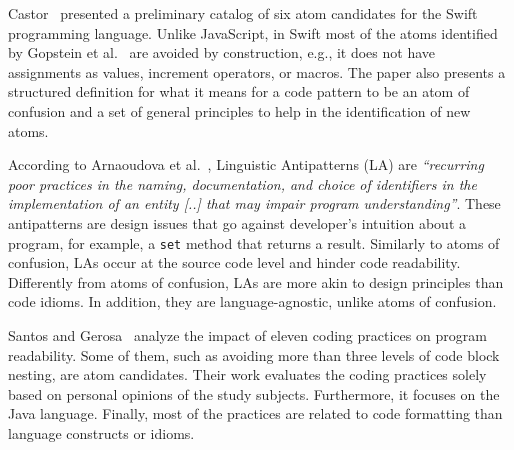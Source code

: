 Castor~\cite{castor2018} presented a preliminary catalog of six atom candidates for the Swift programming language. Unlike JavaScript, in Swift most of the atoms identified by Gopstein et al.~\cite{DBLP:conf/sigsoft/GopsteinIYDZYC17} are avoided by construction, e.g., it does not have assignments as values, increment operators, or macros. The paper also presents a structured definition for what it means for a code pattern to be an atom of confusion and a set of general principles to help in the identification of new atoms. 


According to Arnaoudova et al.~\cite{Arnaoudova:2016:LAW}, Linguistic Antipatterns (LA) are \textit{``recurring poor practices in the naming, documentation, and choice of identifiers in the implementation of an entity [..] that may impair program understanding''}. These antipatterns are design issues that go against developer's  intuition about a program, for example, a \texttt{set} method that returns a result. Similarly to atoms of confusion, LAs occur at the source code level and hinder code readability. Differently from atoms of confusion, LAs are more akin to design principles than code idioms. In addition, they are language-agnostic, unlike atoms of confusion.

Santos and Gerosa~\cite{Santos:2018:ICP} analyze the impact of eleven coding practices on program readability. Some of them, such as avoiding more than three levels of code
block nesting, are atom candidates. 
Their work evaluates the coding practices solely based on personal opinions of the study subjects. Furthermore, it focuses on the Java language. Finally, most of the practices are related to code formatting than language constructs or idioms.

